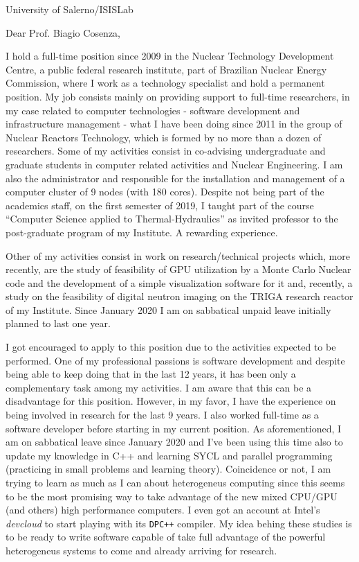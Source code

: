 \documentclass[11pt]{letter}
\begin{document}
\begin{letter}{University of Salerno/ISISLab}

  \opening{Dear Prof. Biagio Cosenza,}
  
  I hold a full-time position since 2009 in the Nuclear Technology Development Centre, a public federal
  research institute, part of Brazilian Nuclear Energy Commission, where I work as a technology
  specialist and hold a permanent position. My job consists mainly on
  providing support to full-time researchers, in my case
  related to computer technologies - software development and infrastructure management - what I have been
  doing since 2011 in the group of Nuclear Reactors Technology, which is formed by no more than a dozen of researchers.
  Some of my activities consist in co-advising undergraduate and graduate students in computer related
  activities and Nuclear Engineering. I am also the administrator and responsible for the installation and management of a
  computer cluster of 9 nodes (with 180 cores). Despite not being part of the academics staff, on the first semester of 2019,
  I taught part of the course ``Computer Science applied to Thermal-Hydraulics'' as invited professor to the post-graduate 
  program of my Institute. A rewarding experience.

  Other of my activities consist in work on research/technical projects which, more recently, are the study of
  feasibility of GPU utilization by a Monte Carlo Nuclear code and the development of
  a simple visualization software for it and, recently, a study on the feasibility of digital neutron imaging on
  the TRIGA research reactor of my Institute. Since January 2020 I am on sabbatical unpaid leave initially planned
  to last one year.
    
  I got encouraged to apply to this position due to the activities expected to be performed. One of my professional
  passions is software development and despite being able to keep doing that in the last 12 years, it has been only
  a complementary task among my activities. I am aware that this can be a disadvantage for this position. However, in my favor, I have the experience on being involved in research for the last 9 years. I also worked full-time as a software developer before starting in my current position. As aforementioned, I am on sabbatical leave since January 2020 and I've been using this time also to update my knowledge in C++ and learning SYCL and parallel programming (practicing in small problems and learning theory). Coincidence or not, I am trying to learn as much as I can about heterogeneus computing since this seems to be the most promising way to take advantage of the new mixed CPU/GPU (and others) high performance computers. I even got an account at Intel's \textit{devcloud} to start playing with its \texttt{DPC++} compiler. My idea behing these studies is to be ready to write software capable of take full advantage of the powerful heterogeneus systems to come and already arriving for research.


\end{letter}
\end{document}
